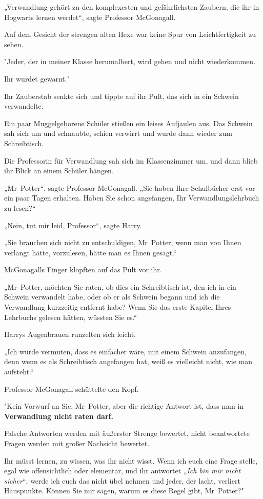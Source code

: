 {„Verwandlung gehört zu den komplexesten und gefährlichsten Zaubern, die ihr in Hogwarts lernen werdet“, sagte Professor McGonagall.

Auf dem Gesicht der strengen alten Hexe war keine Spur von Leichtfertigkeit zu sehen.

"Jeder, der in meiner Klasse herumalbert, wird gehen und nicht wiederkommen.

Ihr wurdet gewarnt."

Ihr Zauberstab senkte sich und tippte auf ihr Pult, das sich in ein Schwein verwandelte.

Ein paar Muggelgeborene Schüler stießen ein leises Aufjaulen aus. Das Schwein sah sich um und schnaubte, schien verwirrt und wurde dann wieder zum Schreibtisch.

Die Professorin für Verwandlung sah sich im Klassenzimmer um, und dann blieb ihr Blick an einem Schüler hängen.

„Mr~Potter“, sagte Professor McGonagall. „Sie haben Ihre Schulbücher erst vor ein paar Tagen erhalten. Haben Sie schon angefangen, Ihr Verwandlungslehrbuch zu lesen?“

„Nein, tut mir leid, Professor“, sagte Harry.

„Sie brauchen sich nicht zu entschuldigen, Mr~Potter, wenn man von Ihnen verlangt hätte, vorzulesen, hätte man es Ihnen gesagt.“

McGonagalls Finger klopften auf das Pult vor ihr.

„Mr~Potter, möchten Sie raten, ob dies ein Schreibtisch ist, den ich in ein Schwein verwandelt habe, oder ob er als Schwein begann und ich die Verwandlung kurzzeitig entfernt habe? Wenn Sie das erste Kapitel Ihres Lehrbuchs gelesen hätten, wüssten Sie es.“

Harrys Augenbrauen runzelten sich leicht.

„Ich würde vermuten, dass es einfacher wäre, mit einem Schwein anzufangen, denn wenn es als Schreibtisch angefangen hat, weiß es vielleicht nicht, wie man aufsteht.“

Professor McGonagall schüttelte den Kopf.

"Kein Vorwurf an Sie, Mr~Potter, aber die richtige Antwort ist, dass man in \textbf{Verwandlung nicht raten darf.}

Falsche Antworten werden mit äußerster Strenge bewertet, nicht beantwortete Fragen werden mit großer Nachsicht bewertet.

Ihr müsst lernen, zu wissen, was ihr nicht wisst. Wenn ich euch eine Frage stelle, egal wie offensichtlich oder elementar, und ihr antwortet „\emph{Ich bin mir nicht sicher}“, werde ich euch das nicht übel nehmen und jeder, der lacht, verliert Hauspunkte. Können Sie mir sagen, warum es diese Regel gibt, Mr~Potter?"

}
